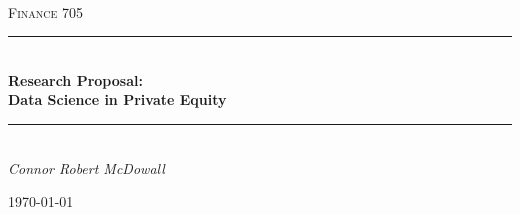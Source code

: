 \documentclass[12pt]{article}
\begin{document}
\begin{titlepage}
	\newcommand{\HRule}{\rule{\linewidth}{0.5mm}} %
	
	\center
	
	
	\textsc{\LARGE }\\[1.5cm] %
	
	\textsc{\Large Finance 705}\\[0.5cm] %
	
	
	\HRule\\[0.5cm]
	
	{\huge\bfseries Research Proposal: \\Data Science in Private Equity}\\[0.4cm] %
	
	\HRule\\[0.5cm]
	
	
	{\large\textit{Connor Robert McDowall}}\\

	
	\vfill\vfill\vfill %
	
	{\large\today} %
	 
	
	\vfill %
	
\end{titlepage}
\end{document}
